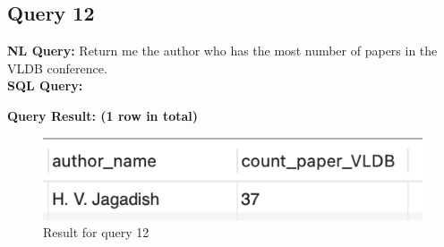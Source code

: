 \documentclass{article}
\begin{document}
\subsection{Query 12}
\textbf{NL Query:}  Return me the author who has the most number of papers in the VLDB conference.
\vspace{6 pt}
\\
\textbf{SQL Query:}

\textbf{Query Result: (1 row in total)}
\begin{figure}[h]
	\centering
	\includegraphics[width=.2\textheight]{figures/q12_res.png}
	\caption{Result for query 12}
	\label{fig:013}
\end{figure}
\end{document}
